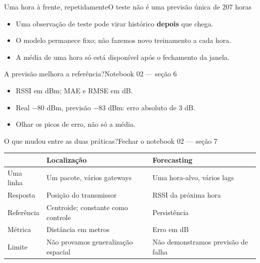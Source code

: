\begin{frame}{Uma hora à frente, repetidamente}{O teste não é uma previsão única de 207 horas}
\centering
{}
\vspace{5mm}
\begin{itemize}
\item Uma observação de teste pode virar histórico \textbf{depois} que chega.
\item O modelo permanece fixo; não fazemos novo treinamento a cada hora.
\item A média de uma hora só está disponível após o fechamento da janela.
\end{itemize}
\end{frame}

\begin{frame}{A previsão melhora a referência?}{Notebook 02 — seção 6}
\begin{itemize}
\item RSSI em dBm; MAE e RMSE em dB.
\item Real $-80$ dBm, previsão $-83$ dBm: erro absoluto de 3 dB.
\item Olhar os picos de erro, não só a média.
\end{itemize}
\end{frame}

\begin{frame}{O que mudou entre as duas práticas?}{Fechar o notebook 02 — seção 7}
\small
\begin{tabular}{p{2.8cm}p{4.8cm}p{4.4cm}}
\toprule
 & Localização & Forecasting\\
\midrule
Uma linha & Um pacote, vários gateways & Uma hora-alvo, vários lags\\[2mm]
Resposta & Posição do transmissor & RSSI da próxima hora\\[2mm]
Referência & Centroide; constante como controle & Persistência\\[2mm]
Métrica & Distância em metros & Erro em dB\\[2mm]
Limite & Não provamos generalização espacial & Não demonstramos previsão de falha\\
\bottomrule
\end{tabular}
\end{frame}

